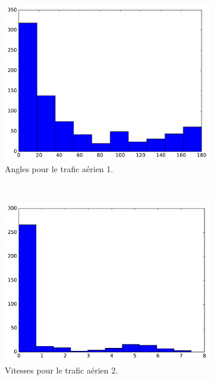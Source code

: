 \begin{figure}
\begin{subfigure}[t]{\subImgWaStats}
			\centering
			\includegraphics[width=\textwidth]{figures/ch3/mhA_angle}
			\caption{Angles pour le trafic aérien 1.}
			\label{fig:mhA_angle}
		\end{subfigure}
		~
		\begin{subfigure}[t]{\subImgWaStats}
			\centering
			\includegraphics[width=\textwidth]{figures/ch3/germanwingsA_speed}
			\caption{Vitesses pour le trafic aérien 2.}
			\label{fig:germanwingsA_speed}
		\end{subfigure}
		~
		\begin{subfigure}[t]{\subImgWaStats}
			\centering

\end{subfigure}
\end{figure}
